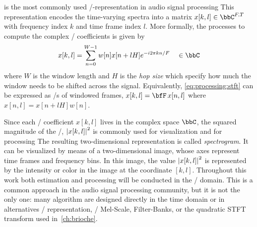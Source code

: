 is the most commonly used \TF/-representation in audio signal processing
This representation encodes the time-varying spectra into a matrix $x[k,l] \in \bbC^{F,T}$ with frequency index $k$ and time frame index $l$. More formally, the processes to compute the complex \STFT/ coefficients is given by
\begin{equation}\label{eq:processing:stft}
    x[k, l]  = \sum_{n=0}^{W-1} w[n] x[n + l H] \cste^{- \csti 2 \pi k n / F} \mathspace\in\bbC
\end{equation}
where $W$ is the window length and $H$ is the \textit{hop size} which specify how much the window needs to be shifted across the signal.
Equivalently, \cref{eq:processing:stft} can be expressed as \DFT/s of windowed frames, $x[k, l] = \discreteFT{x[n,l]}$ where $x[n,l] = x[n + l H] w[n]$.

Since each \STFT/ coefficient $x[k, l]$ lives in the complex space $\bbC$, the squared magnitude of the \STFT/, $\powerOf{x[k,l]}$ is
commonly used for visualization and for processing
The resulting two-dimensional representation is called \textit{spectrogram}.
It can be visualized by means of a two-dimensional image, whose axes represent time frames and frequency bins.
In this image, the value $\powerOf{x[k,l]}$ is represented by the intensity or color in the image at the coordinate $[k,l]$.
Throughout this work both estimation and processing will be conducted in the \STFT/ domain.
This is a common approach in the audio signal processing community, but it is not the only one:
many algorithm are designed directly in the time domain or in alternatives \TF/ representation, \eg/ Mel-Scale, Filter-Banks, or the quadratic STFT transform used in~\cref{ch:brioche}.

